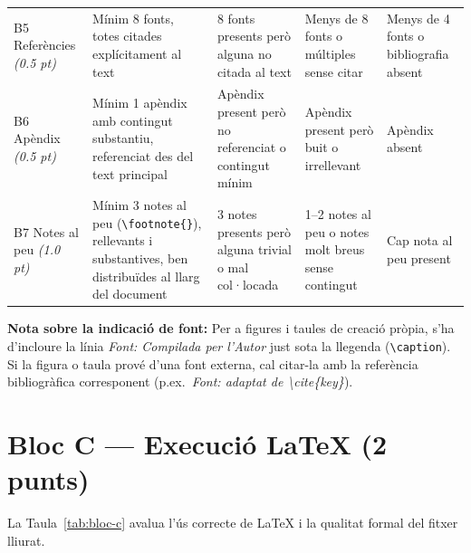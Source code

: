 \documentclass[12pt,a4paper]{article}
\begin{document}
\begin{table}[htbp]
{\begin{tabularx}{\textwidth}{>{\raggedright\arraybackslash}p{3cm}YYYY}
    B5 Referències \emph{(0.5 pt)} & Mínim 8 fonts, totes citades explícitament al text & 8 fonts presents però alguna no citada al text & Menys de 8 fonts o múltiples sense citar & Menys de 4 fonts o bibliografia absent \\
    B6 Apèndix \emph{(0.5 pt)} & Mínim 1 apèndix amb contingut substantiu, referenciat des del text principal & Apèndix present però no referenciat o contingut mínim & Apèndix present però buit o irrellevant & Apèndix absent \\
    B7 Notes al peu \emph{(1.0 pt)} & Mínim 3 notes al peu (\texttt{\textbackslash footnote\{\}}), rellevants i substantives, ben distribuïdes al llarg del document & 3 notes presents però alguna trivial o mal col·locada & 1--2 notes al peu o notes molt breus sense contingut & Cap nota al peu present \\
    \bottomrule
  \end{tabularx}
  }
\end{table}

\medskip
\textbf{Nota sobre la indicació de font:} Per a figures i taules de creació pròpia, s'ha d'incloure la línia \textit{Font: Compilada per l'Autor} just sota la llegenda (\texttt{\textbackslash caption}). Si la figura o taula prové d'una font externa, cal citar-la amb la referència bibliogràfica corresponent (p.ex.\ \textit{Font: adaptat de \textbackslash cite\{key\}}).

\section{Bloc C --- Execució LaTeX (2 punts)}

La Taula~\ref{tab:bloc-c} avalua l'ús correcte de LaTeX i la qualitat formal del fitxer lliurat.
\end{document}
